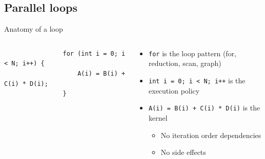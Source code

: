 \documentclass[aspectratio=169]{beamer}
\begin{document}

\subsection{Parallel loops}


\begin{frame}[fragile]{Anatomy of a loop}
    \begin{columns}
        \begin{column}{0.5\linewidth}
            \begin{verbatim}
                for (int i = 0; i < N; i++) {
                    A(i) = B(i) + C(i) * D(i);
                }
            \end{verbatim}
        \end{column}
        \begin{column}{0.5\linewidth}
            \begin{itemize}
                \item \texttt{for} is the loop pattern (for, reduction, scan, graph)
                \item \texttt{int i = 0; i < N; i++} is the execution policy
                \item \texttt{A(i) = B(i) + C(i) * D(i)} is the kernel
                \begin{itemize}
                    \item No iteration order dependencies
                    \item No side effects
                \end{itemize}
            \end{itemize}
        \end{column}
    \end{columns}
\end{frame}

\end{document}
